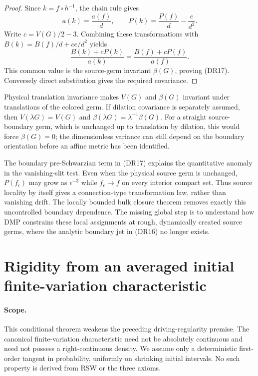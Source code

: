 \documentclass[11pt]{article}
\theoremstyle{definition}\newtheorem{definition}[theorem]{Definition}
\theoremstyle{remark}\newtheorem{remark}[theorem]{Remark}
\begin{document}
\begin{proof}
Since $k=f\circ h^{-1}$, the chain rule gives
\[
 a(k)=\frac{a(f)}d,\qquad
 P(k)=\frac{P(f)}d-\frac e{d^2}.
\]
Write $c=V(G)/2-3$.  Combining these transformations with
$B(k)=B(f)/d+c e/d^2$ yields
\[
 \frac{B(k)+cP(k)}{a(k)}
       =\frac{B(f)+cP(f)}{a(f)}.
\]
This common value is the source-germ invariant $\beta(G)$, proving (DR17).
Conversely direct substitution gives the required covariance.
\end{proof}

Physical translation invariance makes $V(G)$ and $\beta(G)$ invariant under
translations of the colored germ.  If dilation covariance is separately
assumed, then $V(\lambda G)=V(G)$ and
$\beta(\lambda G)=\lambda^{-1}\beta(G)$.  For a straight source-boundary germ,
which is unchanged up to translation by dilation, this would force
$\beta(G)=0$; the dimensionless variance can still depend on the boundary
orientation before an affine metric has been identified.

The boundary pre-Schwarzian term in (DR17) explains the quantitative anomaly
in the vanishing-slit test.  Even when the physical source germ is unchanged,
$P(f_\epsilon)$ may grow as $\epsilon^{-3}$ while $f_\epsilon\to f$ on every
interior compact set.  Thus source locality by itself gives a connection-type
transformation law, rather than vanishing drift.  The locally bounded bulk
closure theorem removes exactly this uncontrolled boundary dependence.
The missing global step is to understand how DMP constrains these local
assignments at rough, dynamically created source germs, where the analytic
boundary jet in (DR16) no longer exists.

\section{Rigidity from an averaged initial finite-variation characteristic}
\label{sec:fv-tangent-rigidity}

\paragraph{Scope.}
This conditional theorem weakens the preceding driving-regularity premise.
The canonical finite-variation characteristic need not be absolutely
continuous and need not possess a right-continuous density. We assume only
a deterministic first-order tangent in probability, uniformly on shrinking
initial intervals. No such property is derived from RSW or the three axioms.
\end{document}

